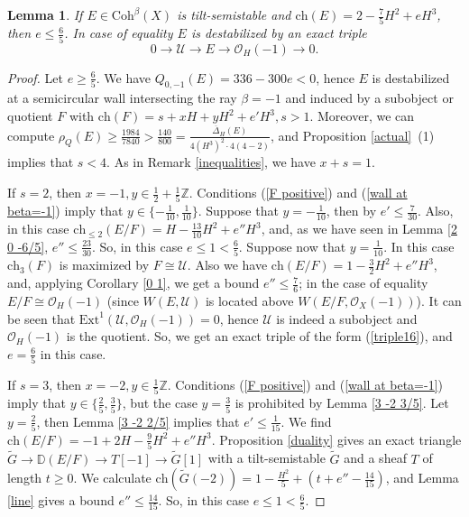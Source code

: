 \documentclass{amsart}
\newtheorem{lemma}[theorem]{Lemma}
\begin{document}
	\begin{lemma}\label{2 0 -7/5} If $E\in\mathrm{Coh}^\beta(X)$ is tilt-semistable and $\mathrm{ch}(E)=2-\frac 75 H^2+eH^3$, then $e\le\frac 65$. In case of equality $E$ is destabilized by an exact triple
		\begin{equation}\label{triple16}0\to\mathcal U\to E\to \mathcal O_H(-1)\to 0.
		\end{equation}
	\end{lemma}
	
	\begin{proof}Let $e\ge\frac 65$. We have $Q_{0,-1}(E)=336-300e<0$, hence $E$ is destabilized at a semicircular wall intersecting the ray $\beta=-1$ and induced by a subobject or quotient $F$ with $\mathrm{ch}(F)=s+xH+yH^2+e'H^3,s>1$. Moreover, we can compute $\rho_Q(E)\ge\frac{1984}{7840}>\frac{140}{800}=\frac{\overline{\Delta}_H(E)}{4(H^3)^2\cdot 4(4-2)}$, and Proposition \ref{actual}~(1) implies that $s<4$. As in Remark \ref{inequalities}, we have $x+s=1$.
		
	If $s=2$, then $x=-1,y\in\frac 12+\frac 15\mathbb Z$. Conditions (\ref{F positive}) and (\ref{wall at beta=-1}) imply that $y\in\{-\frac{1}{10},\frac{1}{10}\}$. Suppose that $y=-\frac{1}{10}$, then by \cite[Lemma 3.8]{Vass} $e'\le\frac{7}{30}$. Also, in this case $\mathrm{ch}_{\le 2}(E/F)=H-\frac{13}{10}H^2+e''H^3$, and, as we have seen in Lemma \ref{2 0 -6/5}, $e''\le\frac{23}{30}$. So, in this case $e\le 1<\frac 65$. Suppose now that $y=\frac{1}{10}$. In this case $\mathrm{ch}_3(F)$ is maximized by $F\cong \mathcal U$. Also we have $\mathrm{ch}(E/F)=1-\frac 32 H^2+e''H^3$, and, applying Corollary \ref{0 1}, we get a bound $e''\le\frac 76$; in the case of equality $E/F\cong\mathcal O_H(-1)$ (since $W(E,\mathcal U)$ is located above $W(E/F,\mathcal O_X(-1))$). It can be seen that $\mathrm{Ext}^1(\mathcal U,\mathcal O_H(-1))=0$, hence $\mathcal U$ is indeed a subobject and $\mathcal O_H(-1)$ is the quotient. So, we get an exact triple of the form (\ref{triple16}), and $e=\frac 65$ in this case.
		
	If $s=3$, then $x=-2,y\in\frac 15\mathbb Z$. Conditions (\ref{F positive}) and (\ref{wall at beta=-1}) imply that $y\in\{\frac 25,\frac 35\}$, but the case $y=\frac 35$ is prohibited by Lemma \ref{3 -2 3/5}. Let $y=\frac 25$, then Lemma \ref{3 -2 2/5} implies that $e'\le\frac{1}{15}$. We find $\mathrm{ch}(E/F)=-1+2H-\frac 95H^2+e''H^3$. Proposition \ref{duality} gives an exact triangle $\widetilde{G}\to\mathbb D(E/F)\to T[-1]\to\widetilde{G}[1]$ with a tilt-semistable $\widetilde{G}$ and a sheaf $T$ of length $t\ge 0$. We calculate $\mathrm{ch}(\widetilde{G}(-2))=1-\frac{H^2}{5}+(t+e''-\frac{14}{15})$, and Lemma \ref{line} gives a bound $e''\le\frac{14}{15}$. So, in this case $e\le 1<\frac 65$.\end{proof}
	
\end{document}
